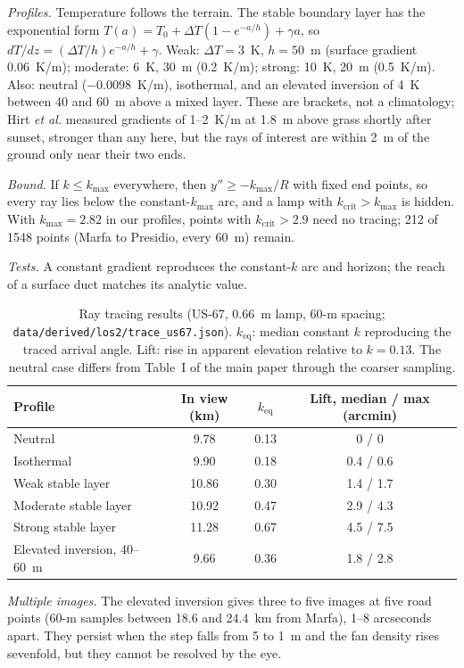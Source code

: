 \documentclass[11pt]{article}
\newcommand{\kc}{k_{\mathrm{crit}}}
\begin{document}
\textit{Profiles.} Temperature follows the terrain. The stable boundary layer has the exponential form\cite{Stull1988} $T(a)=T_0+\Delta T(1-e^{-a/h})+\gamma a$, so $dT/dz=(\Delta T/h)e^{-a/h}+\gamma$. Weak: $\Delta T=3$~K, $h=50$~m (surface gradient 0.06~K/m); moderate: 6~K, 30~m (0.2~K/m); strong: 10~K, 20~m (0.5~K/m). Also: neutral ($-0.0098$~K/m), isothermal, and an elevated inversion of 4~K between 40 and 60~m above a mixed layer. These are brackets, not a climatology; Hirt \textit{et al.} measured gradients of 1--2~K/m at 1.8~m above grass shortly after sunset, stronger than any here, but the rays of interest are within 2~m of the ground only near their two ends.

\textit{Bound.} If $k\le k_{\max}$ everywhere, then $y''\ge-k_{\max}/R$ with fixed end points, so every ray lies below the constant-$k_{\max}$ arc, and a lamp with $\kc>k_{\max}$ is hidden. With $k_{\max}=2.82$ in our profiles, points with $\kc>2.9$ need no tracing; 212 of 1548 points (Marfa to Presidio, every 60~m) remain.

\textit{Tests.} A constant gradient reproduces the constant-$k$ arc and horizon; the reach of a surface duct matches its analytic value.

\begin{table}[htbp]
\caption{Ray tracing results (US-67, 0.66~m lamp, 60-m spacing; \texttt{data/derived/los2/trace\_us67.json}). $k_{\mathrm{eq}}$: median constant $k$ reproducing the traced arrival angle. Lift: rise in apparent elevation relative to $k=0.13$. The neutral case differs from Table~I of the main paper through the coarser sampling.}
\label{t:trace}
\small
\begin{tabular}{lccc}
\toprule
Profile & In view (km) & $k_{\mathrm{eq}}$ & Lift, median / max (arcmin)\\
\midrule
Neutral & 9.78 & 0.13 & 0 / 0\\
Isothermal & 9.90 & 0.18 & 0.4 / 0.6\\
Weak stable layer & 10.86 & 0.30 & 1.4 / 1.7\\
Moderate stable layer & 10.92 & 0.47 & 2.9 / 4.3\\
Strong stable layer & 11.28 & 0.67 & 4.5 / 7.5\\
Elevated inversion, 40--60~m & 9.66 & 0.36 & 1.8 / 2.8\\
\bottomrule
\end{tabular}
\end{table}

\textit{Multiple images.} The elevated inversion gives three to five images at five road points (60-m samples between 18.6 and 24.4~km from Marfa), 1--8 arcseconds apart. They persist when the step falls from 5 to 1~m and the fan density rises sevenfold, but they cannot be resolved by the eye.
\end{document}
